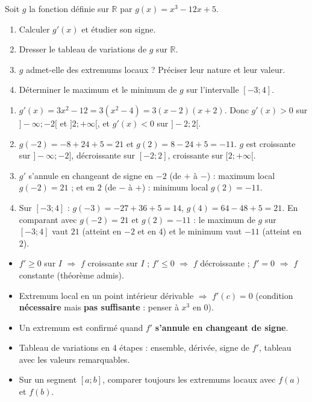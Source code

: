 \documentclass[11pt]{article}
\begin{document}
\begin{exercice}
Soit $g$ la fonction définie sur $\mathbb{R}$ par $g(x) = x^3 - 12x + 5$.
\begin{enumerate}
\item Calculer $g'(x)$ et étudier son signe.
\item Dresser le tableau de variations de $g$ sur $\mathbb{R}$.
\item $g$ admet-elle des extremums locaux ? Préciser leur nature et leur valeur.
\item Déterminer le maximum et le minimum de $g$ sur l'intervalle $[-3 ; 4]$.
\end{enumerate}
\end{exercice}

\begin{corrige}[Exercice 1]
\begin{enumerate}
\item $g'(x) = 3x^2 - 12 = 3(x^2 - 4) = 3(x-2)(x+2)$. Donc $g'(x) > 0$ sur $]-\infty ; -2[$ et $]2 ; +\infty[$, et $g'(x) < 0$ sur $]-2 ; 2[$.
\item $g(-2) = -8 + 24 + 5 = 21$ et $g(2) = 8 - 24 + 5 = -11$. $g$ est croissante sur $]-\infty ; -2]$, décroissante sur $[-2 ; 2]$, croissante sur $[2 ; +\infty[$.
\item $g'$ s'annule en changeant de signe en $-2$ (de $+$ à $-$) : maximum local $g(-2) = 21$ ; et en $2$ (de $-$ à $+$) : minimum local $g(2) = -11$.
\item Sur $[-3 ; 4]$ : $g(-3) = -27 + 36 + 5 = 14$, $g(4) = 64 - 48 + 5 = 21$. En comparant avec $g(-2) = 21$ et $g(2) = -11$ : le maximum de $g$ sur $[-3 ; 4]$ vaut $21$ (atteint en $-2$ et en $4$) et le minimum vaut $-11$ (atteint en $2$).
\end{enumerate}
\end{corrige}

\begin{aretenir}
\begin{itemize}
\item $f' \geq 0$ sur $I$ $\Rightarrow$ $f$ croissante sur $I$ ; $f' \leq 0$ $\Rightarrow$ $f$ décroissante ; $f' = 0$ $\Rightarrow$ $f$ constante (théorème admis).
\item Extremum local en un point intérieur dérivable $\Rightarrow$ $f'(c) = 0$ (condition \textbf{nécessaire} mais \textbf{pas suffisante} : penser à $x^3$ en $0$).
\item Un extremum est confirmé quand $f'$ \textbf{s'annule en changeant de signe}.
\item Tableau de variations en 4 étapes : ensemble, dérivée, signe de $f'$, tableau avec les valeurs remarquables.
\item Sur un segment $[a ; b]$, comparer toujours les extremums locaux avec $f(a)$ et $f(b)$.
\end{itemize}
\end{aretenir}
\end{document}
